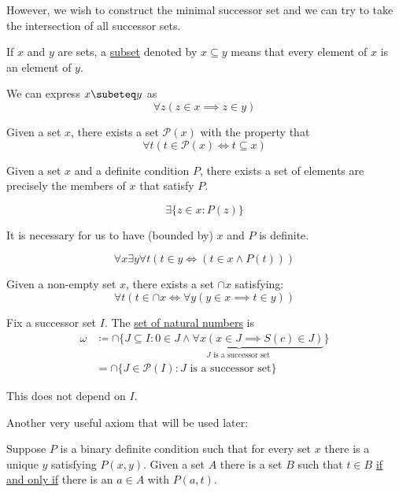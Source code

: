 \documentclass[11pt]{article}
\begin{document}
\begin{titlepage}
However, we wish to construct the minimal successor set and we can try to take
the intersection of all successor sets.
\begin{definition}
	If $x$ and $y$ are sets, a \underline{subset} denoted by $x \subseteq y$
	means that every element of $x$ is an element of $y$.
\end{definition}
We can express $x \subeteq y$ as
\begin{equation*}
	\forall z (z \in x \implies z \in y)
\end{equation*}
\begin{prop}
	Given a set $x$, there exists a set $\mathcal{P}(x)$ with the property that
	\begin{equation*}
		\forall t(t \in \mathcal{P}(x) \iff t \subseteq x)
	\end{equation*}
\end{prop}
\begin{prop}
	Given a set $x$ and a definite condition $P$, there exists a set of elements
	are precisely the members of $x$ that satisfy $P$.
\end{prop}
\begin{equation*}
	\exists \{z\in x : P(z)\}
\end{equation*}
\begin{remark}
	It is necessary for us to have (bounded by) $x$ and $P$ is definite.
\end{remark}
\begin{equation*}
	\forall x \exists y \forall t (t \in y \iff (t \in x \wedge P(t)))
\end{equation*}
\begin{exercise}
	Given a non-empty set $x$, there exists a set $\cap x$ satisfying:
	\begin{equation*}
		\forall t (t \in \cap x \iff \forall y (y \in x \implies t \in y))
	\end{equation*}
\end{exercise}
\begin{definition}
	Fix a successor set $I$. The \underline{set of natural numbers} is
	\begin{align*}
		\omega &\coloneqq \cap\{ J \subseteq I : \underbrace{0 \in J \wedge
		\forall x(x \in J \implies S(c) \in J)}_{J \text{ is a successor set
		}}\}\\
		&= \cap\{ J \in \mathcal{P}(I) : J \text{ is a successor set}\}
	\end{align*}
\end{definition}
\begin{exercise}
	This does not depend on $I$.
\end{exercise}
Another very useful axiom that will be used later:
\begin{prop}
	Suppose $P$ is a binary definite condition such that for every set $x$ there
	is a unique $y$ satisfying $P(x,y)$. Given a set $A$ there is a set $B$ such
	that $t \in B$ \underline{if and only if} there is an $a \in A$ with
	$P(a, t)$.
\end{prop}


\end{titlepage}
\end{document}
